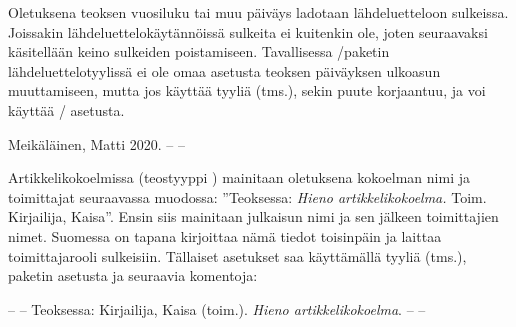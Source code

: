 \begin{koodilohkosis}
\end{koodilohkosis}

Oletuksena teoksen vuosiluku tai muu päiväys ladotaan lähdeluetteloon
sulkeissa. Joissakin lähdeluettelokäytännöissä sulkeita ei kuitenkin
ole, joten seuraavaksi käsitellään keino sulkeiden poistamiseen.
Tavallisessa \-/paketin lähdeluettelotyylissä
 ei ole omaa asetusta teoksen päiväyksen ulkoasun
muuttamiseen, mutta jos käyttää tyyliä  (tms.),
sekin puute korjaantuu, ja voi käyttää \-/
asetusta.

\begin{koodilohkosis}
  \usepackage[style=ext-authoryear]{biblatex}

\end{koodilohkosis}

\begin{tulossis}
  Meikäläinen, Matti 2020. -- --
\end{tulossis}

Artikkelikokoelmissa (teostyyppi ) mainitaan
oletuksena kokoelman nimi ja toimittajat seuraavassa muodossa:
''Teoksessa: \textit{Hieno artikkelikokoelma.} Toim. Kirjailija,
Kaisa''. Ensin siis mainitaan julkaisun nimi ja sen jälkeen toimittajien
nimet. Suomessa on tapana kirjoittaa nämä tiedot toisinpäin ja laittaa
toimittajarooli sulkeisiin. Tällaiset asetukset saa käyttämällä tyyliä
 (tms.), paketin asetusta
 ja seuraavia komentoja:

\begin{koodilohkosis}
  \usepackage[style=ext-authoryear, innamebeforetitle=true]{biblatex}

\end{koodilohkosis}

\begin{tulossis}
  -- -- Teoksessa: Kirjailija, Kaisa (toim.). \textit{Hieno
    artikkelikokoelma}. -- --
\end{tulossis}

